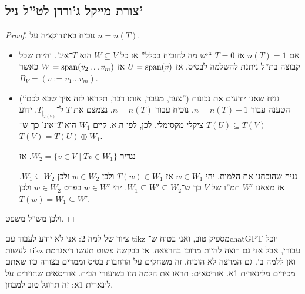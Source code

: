 \documentclass[]{../../../../tex/classes/styledArticle}
\begin{document}
    \subsection{צורת מייקל ג'ורדן לט''ל ניל'}
    \begin{proof}
        נוכיח באינדוקציה על $n = n(T)$. 
        \begin{itemize}
            \item[בסיס: ]אם $n(T) = 1$ אז $T = 0$ ``יש מה להוכיח בכלל'' אז כל $W \subseteq V$ הוא $T$־אינ'. והיות שכל קבוצה בת''ל ניתנת להשלמה לבסיס, אז $U = \operatorname{span}(v)$ אז $W = \operatorname{span}(v_2 \dots v_m)$ כאשר $B_V = (v := v_1 \dots v_m)$. 
            \item[צעד: ](``צעד, מעבר, אותו דבר, תקראו לזה איך שבא לכם'') נניח שאנו יודעים את נכונות הטענה עבור $n = n(T) - 1$. נוכיח עבור $n = n(T)$. נצמצם את $T$ ל־$T_{|_{T(V)}}$. ידוע $T(U) \subseteq T(V)$ ציקלי מקסימלי. לכן, לפי ה.א. קיים $W_1$ הוא $T$־אינ' כך ש־$T(V) = T(U) \oplus W_1$. 
            
            נגדיר $W_2 = \{v \in V \mid Tv \in W_1\}$. אז 
            
            נניח שהוכחנו את הלמות. יהי $w \in W_1$ אז $T(w) \in W_1$ ולכן $w \in W_2$ ולכן $W_1 \subseteq W_2$.          
            אז מצאנו $W'$ תמ''ו של $V$ כך ש־$W_1 \subseteq W' \subseteq W_2$. יהי $w \in W'$ בפרט $w \in W_2$ ולכן $T(w) = W_1 \subseteq W'$. 
        \end{itemize}
        ולכן מש''ל משפט. 
    \end{proof}
    
    ציור של למה 2: אני לא יודע לעבוד עם tikz מספיק טוב, ואני בטוח ש־chatGPT יוכל לעשות tikz עבורי, אבל אני גם רוצה להיות מרוכז בהרצאה. אז בבקשה פשוט תעשו דיאגרמת ואן ללמה ב'. גם המרצה לא הוכיח, זה משחקים על הרחבות בסיס וממדים בצורה כזו שאתם מכירים מלינארית 1א. אודיסאים: תראו את הלמה הזו בשיעורי הבית. אודיסאים שחוזרים על לינארית 1א: זה תרוגל טוב למבחן. 
    
\end{document}
